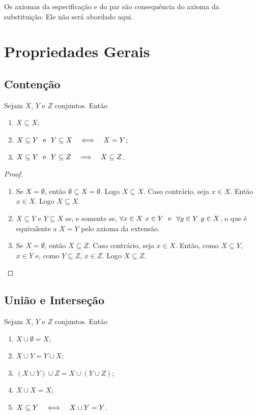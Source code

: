 Os axiomas da especificação e do par são consequência do axioma da substituição. Ele não será abordado aqui.

\section*{Propriedades Gerais}

\subsection*{Contenção}

\begin{prop}
Sejam $X$, $Y$ e $Z$ conjuntos. Então
	\begin{enumerate}
	\item $X \subseteq X$;
	\item $X \subseteq Y \text{\ \ e\ \ } Y \subseteq X \quad \Longleftrightarrow \quad X=Y$;
	\item $X \subseteq Y \text{\ \ e\ \ } Y \subseteq Z \quad \Longrightarrow \quad X \subseteq Z$.
	\end{enumerate}
\end{prop}
\begin{proof}
	\begin{enumerate}
	\item Se $X=\emptyset$, então $\emptyset \subseteq X = \emptyset$. Logo $X \subseteq X$. Caso contrário, seja $x \in X$. Então $x \in X$. Logo $X \subseteq X$.
	\item $X \subseteq Y$ e $Y \subseteq X$ se, e somente se, $\forall x \in X \ x \in Y \text{\ \ e\ \ } \forall y \in Y \ y \in X$, o que é equivalente a $X=Y$ pelo axioma da extensão.
	\item Se $X=\emptyset$, então $X \subseteq Z$. Caso contrário, seja $x \in X$. Então, como $X \subseteq Y$, $x \in Y$ e, como $Y \subseteq Z$, $x \in Z$. Logo $X \subseteq Z$.
	\end{enumerate}
\end{proof}

\subsection*{União e Interseção}

\begin{prop}
Sejam $X$, $Y$ e $Z$ conjuntos. Então
	\begin{enumerate}
	\item $X \cup \emptyset = X$;
	\item $X \cup Y = Y \cup X$;
	\item $(X \cup Y) \cup Z = X \cup (Y \cup Z)$;
	\item $X \cup X = X$;
	\item $X \subseteq Y \quad \Longleftrightarrow \quad X \cup Y = Y$.
	\end{enumerate}
\end{prop}

